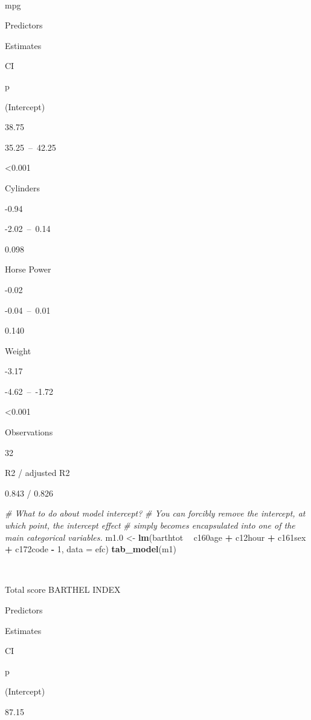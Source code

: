 \documentclass[]{article}
\newenvironment{Shaded}{\begin{snugshade}}{\end{snugshade}}
\newcommand{\KeywordTok}[1]{\textcolor[rgb]{0.13,0.29,0.53}{\textbf{#1}}}
\newcommand{\DataTypeTok}[1]{\textcolor[rgb]{0.13,0.29,0.53}{#1}}
\newcommand{\DecValTok}[1]{\textcolor[rgb]{0.00,0.00,0.81}{#1}}
\newcommand{\StringTok}[1]{\textcolor[rgb]{0.31,0.60,0.02}{#1}}
\newcommand{\CommentTok}[1]{\textcolor[rgb]{0.56,0.35,0.01}{\textit{#1}}}
\newcommand{\OperatorTok}[1]{\textcolor[rgb]{0.81,0.36,0.00}{\textbf{#1}}}
\newcommand{\NormalTok}[1]{#1}
\begin{document}
~

mpg

Predictors

Estimates

CI

p

(Intercept)

38.75

35.25~--~42.25

\textless{}0.001

Cylinders

-0.94

-2.02~--~0.14

0.098

Horse Power

-0.02

-0.04~--~0.01

0.140

Weight

-3.17

-4.62~--~-1.72

\textless{}0.001

Observations

32

R2 / adjusted R2

0.843 / 0.826

\begin{Shaded}
\begin{Highlighting}[]
\CommentTok{# What to do about model intercept?}
\CommentTok{# You can forcibly remove the intercept, at which point, the intercept effect}
\CommentTok{# simply becomes encapsulated into one of the main categorical variables.}
\NormalTok{m1.}\DecValTok{0}\NormalTok{ <-}\StringTok{ }\KeywordTok{lm}\NormalTok{(barthtot }\OperatorTok{~}\StringTok{ }\NormalTok{c160age }\OperatorTok{+}\StringTok{ }\NormalTok{c12hour }\OperatorTok{+}\StringTok{ }\NormalTok{c161sex }\OperatorTok{+}\StringTok{ }\NormalTok{c172code }\OperatorTok{-}\StringTok{ }\DecValTok{1}\NormalTok{, }\DataTypeTok{data =}\NormalTok{ efc)}
\KeywordTok{tab_model}\NormalTok{(m1)}
\end{Highlighting}
\end{Shaded}

~

Total score BARTHEL INDEX

Predictors

Estimates

CI

p

(Intercept)

87.15
\end{document}
